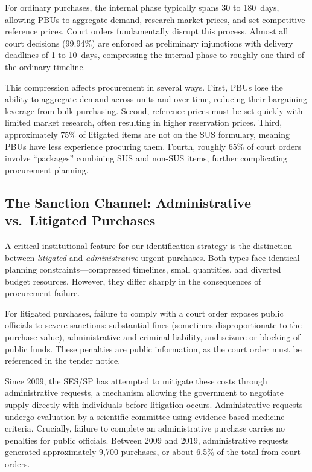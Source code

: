 For ordinary purchases, the internal phase typically spans 30 to 180~days, allowing PBUs to aggregate demand, research market prices, and set competitive reference prices. Court orders fundamentally disrupt this process. Almost all court decisions (99.94\%) are enforced as preliminary injunctions with delivery deadlines of 1 to 10~days, compressing the internal phase to roughly one-third of the ordinary timeline.

This compression affects procurement in several ways. First, PBUs lose the ability to aggregate demand across units and over time, reducing their bargaining leverage from bulk purchasing. Second, reference prices must be set quickly with limited market research, often resulting in higher reservation prices. Third, approximately 75\% of litigated items are not on the SUS formulary, meaning PBUs have less experience procuring them. Fourth, roughly 65\% of court orders involve ``packages'' combining SUS and non-SUS items, further complicating procurement planning.

\subsection{The Sanction Channel: Administrative vs.\ Litigated Purchases}
\label{sec:sanction_channel}

A critical institutional feature for our identification strategy is the distinction between \textit{litigated} and \textit{administrative} urgent purchases. Both types face identical planning constraints---compressed timelines, small quantities, and diverted budget resources. However, they differ sharply in the consequences of procurement failure.

For litigated purchases, failure to comply with a court order exposes public officials to severe sanctions: substantial fines (sometimes disproportionate to the purchase value), administrative and criminal liability, and seizure or blocking of public funds. These penalties are public information, as the court order must be referenced in the tender notice.

Since 2009, the SES/SP has attempted to mitigate these costs through administrative requests, a mechanism allowing the government to negotiate supply directly with individuals before litigation occurs. Administrative requests undergo evaluation by a scientific committee using evidence-based medicine criteria. Crucially, failure to complete an administrative purchase carries no penalties for public officials. Between 2009 and 2019, administrative requests generated approximately 9,700 purchases, or about 6.5\% of the total from court orders.

